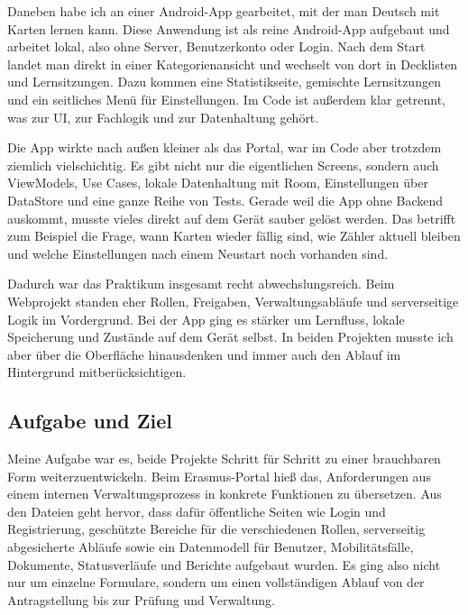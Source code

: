\documentclass{Vorlage}
\begin{document}
Daneben habe ich an einer Android-App gearbeitet, mit der man Deutsch mit Karten lernen kann. Diese Anwendung ist als reine Android-App aufgebaut und arbeitet lokal, also ohne Server, Benutzerkonto oder Login. Nach dem Start landet man direkt in einer Kategorienansicht und wechselt von dort in Decklisten und Lernsitzungen. Dazu kommen eine Statistikseite, gemischte Lernsitzungen und ein seitliches Men\"u f\"ur Einstellungen. Im Code ist au\ss{}erdem klar getrennt, was zur UI, zur Fachlogik und zur Datenhaltung geh\"ort.

Die App wirkte nach au\ss{}en kleiner als das Portal, war im Code aber trotzdem ziemlich vielschichtig. Es gibt nicht nur die eigentlichen Screens, sondern auch ViewModels, Use Cases, lokale Datenhaltung mit Room, Einstellungen \"uber DataStore und eine ganze Reihe von Tests. Gerade weil die App ohne Backend auskommt, musste vieles direkt auf dem Ger\"at sauber gel\"ost werden. Das betrifft zum Beispiel die Frage, wann Karten wieder f\"allig sind, wie Z\"ahler aktuell bleiben und welche Einstellungen nach einem Neustart noch vorhanden sind.

Dadurch war das Praktikum insgesamt recht abwechslungsreich. Beim Webprojekt standen eher Rollen, Freigaben, Verwaltungsabl\"aufe und serverseitige Logik im Vordergrund. Bei der App ging es st\"arker um Lernfluss, lokale Speicherung und Zust\"ande auf dem Ger\"at selbst. In beiden Projekten musste ich aber \"uber die Oberfl\"ache hinausdenken und immer auch den Ablauf im Hintergrund mitber\"ucksichtigen.


\subsection{Aufgabe und Ziel}

Meine Aufgabe war es, beide Projekte Schritt f\"ur Schritt zu einer brauchbaren Form weiterzuentwickeln. Beim Erasmus-Portal hie\ss{} das, Anforderungen aus einem internen Verwaltungsprozess in konkrete Funktionen zu \"ubersetzen. Aus den Dateien geht hervor, dass daf\"ur \"offentliche Seiten wie Login und Registrierung, gesch\"utzte Bereiche f\"ur die verschiedenen Rollen, serverseitig abgesicherte Abl\"aufe sowie ein Datenmodell f\"ur Benutzer, Mobilit\"atsf\"alle, Dokumente, Statusverl\"aufe und Berichte aufgebaut wurden. Es ging also nicht nur um einzelne Formulare, sondern um einen vollst\"andigen Ablauf von der Antragstellung bis zur Pr\"ufung und Verwaltung.
\end{document}
